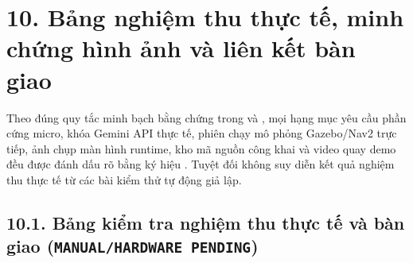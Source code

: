 \section*{10. Bảng nghiệm thu thực tế, minh chứng hình ảnh và liên kết bàn giao}

Theo đúng quy tắc minh bạch bằng chứng trong  và , mọi hạng mục yêu cầu phần cứng micro, khóa Gemini API thực tế, phiên chạy mô phỏng Gazebo/Nav2 trực tiếp, ảnh chụp màn hình runtime, kho mã nguồn công khai và video quay demo đều được đánh dấu rõ bằng ký hiệu \pending{}. Tuyệt đối không suy diễn kết quả nghiệm thu thực tế từ các bài kiểm thử tự động giả lập.

\subsection*{10.1. Bảng kiểm tra nghiệm thu thực tế và bàn giao (\texttt{MANUAL/HARDWARE PENDING})}

